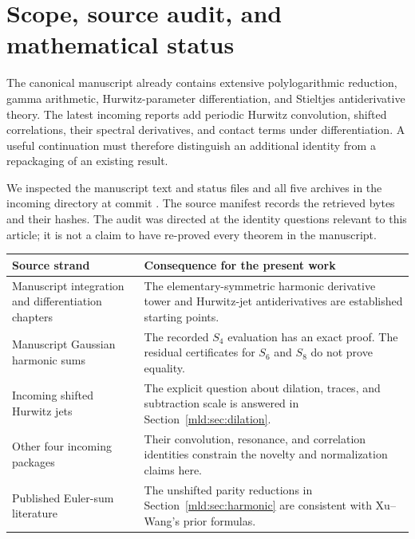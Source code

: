 \section{Scope, source audit, and mathematical status}\label{mld:sec:scope}

The canonical manuscript already contains extensive polylogarithmic reduction, gamma arithmetic, Hurwitz-parameter differentiation, and Stieltjes antiderivative theory. The latest incoming reports add periodic Hurwitz convolution, shifted correlations, their spectral derivatives, and contact terms under differentiation. A useful continuation must therefore distinguish an additional identity from a repackaging of an existing result.

We inspected the manuscript text and status files and all five archives in the incoming directory at commit
\cite{ProveIt,IncomingResonance,IncomingShifted,IncomingConvolution,IncomingClosure,IncomingCalculus}.
The source manifest records the retrieved bytes and their hashes. The audit was directed at the identity questions relevant to this article; it is not a claim to have re-proved every theorem in the manuscript.

\begin{center}
\begin{tabularx}{\textwidth}{@{}>{\raggedright\arraybackslash}p{}Y@{}}
\toprule
Source strand & Consequence for the present work\\
\midrule
Manuscript integration and differentiation chapters & The elementary-symmetric harmonic derivative tower and Hurwitz-jet antiderivatives are established starting points.\\
Manuscript Gaussian harmonic sums & The recorded $S_4$ evaluation has an exact proof. The residual certificates for $S_6$ and $S_8$ do not prove equality.\\
Incoming shifted Hurwitz jets & The explicit question about dilation, traces, and subtraction scale is answered in Section~\ref{mld:sec:dilation}.\\
Other four incoming packages & Their convolution, resonance, and correlation identities constrain the novelty and normalization claims here.\\
Published Euler-sum literature & The unshifted parity reductions in Section~\ref{mld:sec:harmonic} are consistent with Xu--Wang's prior formulas.\\
\bottomrule
\end{tabularx}
\end{center}

